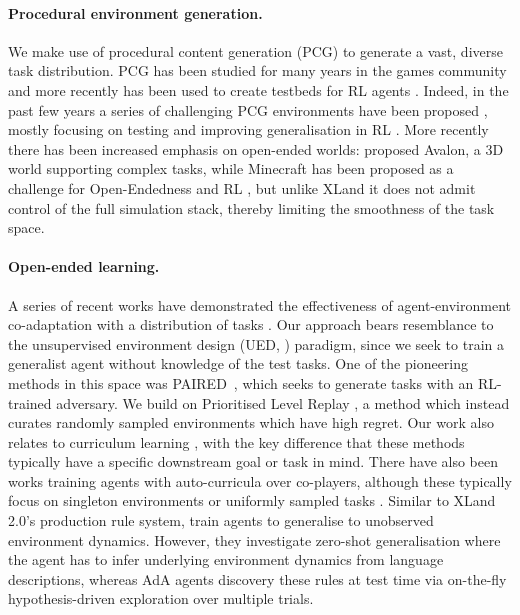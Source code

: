 \documentclass[11pt, a4paper, logo, copyright]{deepmind}
\begin{document}
\paragraph{Procedural environment generation.} We make use of procedural content generation (PCG) to generate a vast, diverse task distribution. PCG has been studied for many years in the games community \citep{togelius2008evolving, pcg} and more recently has been used to create testbeds for RL agents \citep{pcg_illuminating, coinrun, raileanu2020ride}. Indeed, in the past few years a series of challenging PCG environments have been proposed \citep{obstacletower, cobbe2020procgen, kuettler2020nethack, samvelyan2021minihack, gym_minigrid, hafner2022benchmarking, https://doi.org/10.48550/arxiv.2206.06994}, mostly focusing on testing and improving generalisation in RL \citep{rl_generalization_survey, bhatt2022dsage, fontaine2021overcooked}. More recently there has been increased emphasis on open-ended worlds: \citet{albrecht2022avalon} proposed Avalon, a 3D world supporting complex tasks, while Minecraft \citep{johnson2016malmo} has been proposed as a challenge for Open-Endedness and RL \citep{minerl2021, fan2022minedojo, evocraft2021}, but unlike XLand it does not admit control of the full simulation stack, thereby limiting the smoothness of the task space.
\paragraph{Open-ended learning.} A series of recent works have demonstrated the effectiveness of agent-environment co-adaptation with a distribution of tasks \citep{wang2019poet, wang2020enhanced_poet, accel}. Our approach bears resemblance to the unsupervised environment design (UED, \citet{dennis2020paired}) paradigm, since we seek to train a generalist agent without knowledge of the test tasks. One of the pioneering methods in this space was PAIRED~\citep{dennis2020paired}, which seeks to generate tasks with an RL-trained adversary. We build on Prioritised Level Replay \citep{jiang2020prioritized, jiang2021robustplr}, a method which instead curates randomly sampled environments which have high regret. Our work also relates to curriculum learning \citep{matiisen2020tscl, portelas2019teacher, sukhbaatar2018asp, openai2021asymmetric, campero2020amigo, fang2021adaptive,mu2022improving}, with the key difference that these methods typically have a specific downstream goal or task in mind. There have also been works training agents with auto-curricula over co-players, although these typically focus on singleton environments \citep{alphastar, dota} or uniformly sampled tasks \citep{Baker2020Emergent, Jaderberg859, liu2018emergent, https://doi.org/10.48550/arxiv.2203.00715}. Similar to XLand 2.0's production rule system, \citet{DBLP:conf/iclr/ZhongRG20} train agents to generalise to unobserved environment dynamics. However, they investigate zero-shot generalisation where the agent has to infer underlying environment dynamics from language descriptions, whereas AdA agents discovery these rules at test time via on-the-fly hypothesis-driven exploration over multiple trials.
\end{document}
